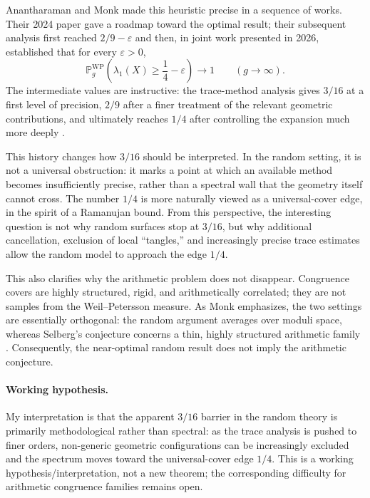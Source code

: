\documentclass[9pt]{article}
\begin{document}
Anantharaman and Monk made this heuristic precise in a sequence of works. Their 2024 paper gave a roadmap toward the optimal result; their subsequent analysis first reached $2/9-\varepsilon$ and then, in joint work presented in 2026, established that for every $\varepsilon>0$,
\[
\mathbb P^{\mathrm{WP}}_g\!\left(\lambda_1(X)\geq\frac14-\varepsilon\right)\longrightarrow1
\qquad (g\to\infty).
\]
The intermediate values are instructive: the trace-method analysis gives $3/16$ at a first level of precision, $2/9$ after a finer treatment of the relevant geometric contributions, and ultimately reaches $1/4$ after controlling the expansion much more deeply \cite{AnantharamanMonk2024,AnantharamanMonk2026,Monk2026}.

This history changes how $3/16$ should be interpreted. In the random setting, it is not a universal obstruction: it marks a point at which an available method becomes insufficiently precise, rather than a spectral wall that the geometry itself cannot cross. The number $1/4$ is more naturally viewed as a universal-cover edge, in the spirit of a Ramanujan bound. From this perspective, the interesting question is not why random surfaces stop at $3/16$, but why additional cancellation, exclusion of local ``tangles,'' and increasingly precise trace estimates allow the random model to approach the edge $1/4$.

This also clarifies why the arithmetic problem does not disappear. Congruence covers are highly structured, rigid, and arithmetically correlated; they are not samples from the Weil--Petersson measure. As Monk emphasizes, the two settings are essentially orthogonal: the random argument averages over moduli space, whereas Selberg's conjecture concerns a thin, highly structured arithmetic family \cite{Monk2026}. Consequently, the near-optimal random result does not imply the arithmetic conjecture.

\paragraph{Working hypothesis.}
My interpretation is that the apparent $3/16$ barrier in the random theory is primarily methodological rather than spectral: as the trace analysis is pushed to finer orders, non-generic geometric configurations can be increasingly excluded and the spectrum moves toward the universal-cover edge $1/4$. This is a working hypothesis/interpretation, not a new theorem; the corresponding difficulty for arithmetic congruence families remains open.
\end{document}

